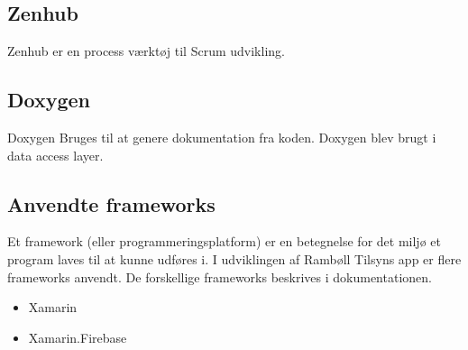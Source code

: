 \subsection*{Zenhub}
Zenhub \cite{Zenhub} er en process værktøj til Scrum udvikling.

\subsection*{Doxygen}
Doxygen \cite{DoxygenInfo} Bruges til at genere dokumentation fra koden. Doxygen blev brugt i data access layer.   

\subsection*{Anvendte frameworks} 
Et framework (eller programmeringsplatform) er en betegnelse for det miljø 
et program laves til at kunne udføres i. I udviklingen af Rambøll Tilsyns app
er flere frameworks anvendt. De forskellige frameworks beskrives i dokumentationen.
\begin{itemize}[-]
	\item Xamarin \cite{XamarinDoc}
	\item Xamarin.Firebase \cite{FirebaseDoc}
	
	
\end{itemize}
